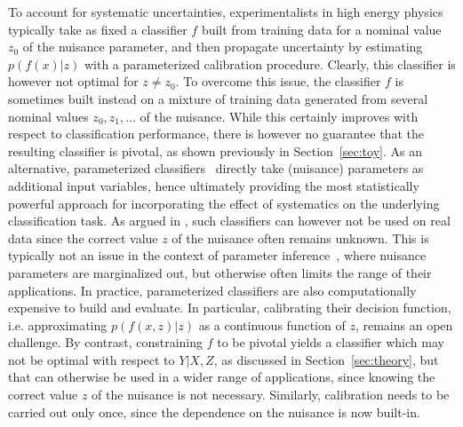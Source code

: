 \documentclass[twocolumn,superscriptaddress,aps]{revtex4-1}
\theoremstyle{plain}
\begin{document}
To account for systematic uncertainties, experimentalists in high energy physics
typically take as fixed a classifier $f$ built from training data for a nominal
value $z_0$ of the nuisance parameter, and then propagate uncertainty
 by estimating $p(f(x)|z)$ with a parameterized calibration
procedure. Clearly, this classifier is however not optimal for $z \neq z_0$.
To overcome this issue, the classifier $f$ is sometimes built instead on a mixture
of training data generated from several nominal values $z_0, z_1, \dots$ of the nuisance.
While this certainly improves with respect to classification performance,
there is however no guarantee that the resulting classifier is pivotal, as shown
previously in Section~\ref{sec:toy}.
As an alternative, parameterized
classifiers~\citep{cranmer2015approximating,Baldi:2016fzo} directly take
(nuisance) parameters as additional input variables, hence ultimately providing
the most statistically powerful approach for incorporating the effect of
systematics on the underlying classification task.  As argued in
\citep{Neal:2007zz}, such classifiers can however not be used on real data since
the correct value $z$ of the nuisance often remains unknown. This is typically
not an issue in the context of parameter
inference~\citep{cranmer2015approximating}, where nuisance parameters are
marginalized out, but otherwise often limits the range of their applications. In
practice, parameterized classifiers  are also computationally expensive to build
and evaluate. In particular, calibrating their decision function, i.e.
approximating $p(f(x,z)|z)$ as a continuous function of $z$, remains an open
challenge. By contrast, constraining $f$ to be pivotal yields a classifier which
may not be optimal with respect to $Y|X,Z$, as discussed in
Section~\ref{sec:theory}, but that can otherwise be used in a wider range of
applications, since knowing the correct value $z$ of the nuisance is not
necessary. Similarly, calibration needs to be carried out only once, since  the
dependence on the nuisance is now built-in.
\end{document}
